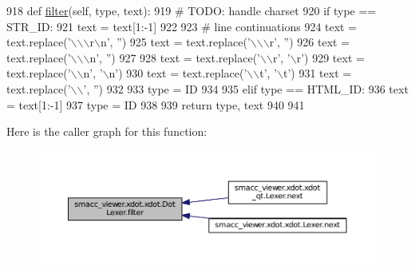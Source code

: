 \begin{DoxyCode}
918     \textcolor{keyword}{def }\hyperlink{classsmacc__viewer_1_1xdot_1_1xdot_1_1DotLexer_a1e1a54b0e7f85ff4206024322acbf5f5}{filter}(self, type, text):
919         \textcolor{comment}{# TODO: handle charset}
920         \textcolor{keywordflow}{if} type == STR\_ID:
921             text = text[1:-1]
922 
923             \textcolor{comment}{# line continuations}
924             text = text.replace(\textcolor{stringliteral}{'\(\backslash\)\(\backslash\)\(\backslash\)r\(\backslash\)n'}, \textcolor{stringliteral}{''})
925             text = text.replace(\textcolor{stringliteral}{'\(\backslash\)\(\backslash\)\(\backslash\)r'}, \textcolor{stringliteral}{''})
926             text = text.replace(\textcolor{stringliteral}{'\(\backslash\)\(\backslash\)\(\backslash\)n'}, \textcolor{stringliteral}{''})
927             
928             text = text.replace(\textcolor{stringliteral}{'\(\backslash\)\(\backslash\)r', '}\(\backslash\)r')
929             text = text.replace(\textcolor{stringliteral}{'\(\backslash\)\(\backslash\)n'}, \textcolor{stringliteral}{'\(\backslash\)n'})
930             text = text.replace(\textcolor{stringliteral}{'\(\backslash\)\(\backslash\)t'}, \textcolor{stringliteral}{'\(\backslash\)t'})
931             text = text.replace(\textcolor{stringliteral}{'\(\backslash\)\(\backslash\)'}, \textcolor{stringliteral}{''})
932 
933             type = ID
934 
935         \textcolor{keywordflow}{elif} type == HTML\_ID:
936             text = text[1:-1]
937             type = ID
938 
939         \textcolor{keywordflow}{return} type, text
940 
941 
\end{DoxyCode}


Here is the caller graph for this function\+:
\nopagebreak
\begin{figure}[H]
\begin{center}
\leavevmode
\includegraphics[width=350pt]{classsmacc__viewer_1_1xdot_1_1xdot_1_1DotLexer_a1e1a54b0e7f85ff4206024322acbf5f5_icgraph}
\end{center}
\end{figure}




